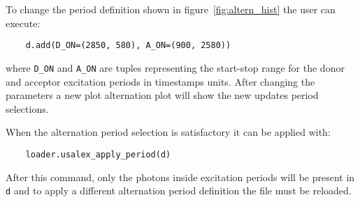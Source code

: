 To change the period definition shown in figure~\ref{fig:altern_hist}
the user can execute:

\begin{verbatim}
    d.add(D_ON=(2850, 580), A_ON=(900, 2580))
\end{verbatim}

where \verb|D_ON| and \verb|A_ON| are tuples representing 
the start-stop range for the donor and acceptor excitation periods 
in timestamps units. After changing the parameters a new plot
alternation plot will show the new updates period selections.

When the alternation period selection is satisfactory it can
be applied with:

\begin{verbatim}
    loader.usalex_apply_period(d)
\end{verbatim}

After this command, only the photons inside excitation periods
will be present in \verb|d| and to apply a different alternation 
period definition the file must be reloaded.

